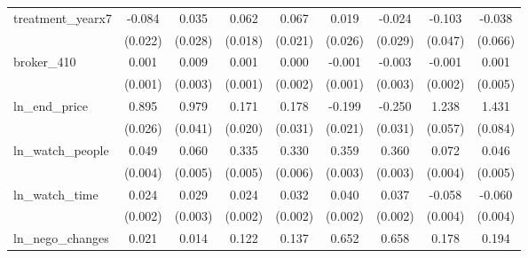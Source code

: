 {\begin{adjustbox}{max width=\textwidth}
\begin{tabular}{l*{8}{c}}
\addlinespace
treatment\_yearx7&      -0.084\sym{***}&       0.035         &       0.062\sym{***}&       0.067\sym{***}&       0.019         &      -0.024         &      -0.103\sym{**} &      -0.038         \\
            &     (0.022)         &     (0.028)         &     (0.018)         &     (0.021)         &     (0.026)         &     (0.029)         &     (0.047)         &     (0.066)         \\
\addlinespace
broker\_410  &       0.001         &       0.009\sym{***}&       0.001         &       0.000         &      -0.001         &      -0.003         &      -0.001         &       0.001         \\
            &     (0.001)         &     (0.003)         &     (0.001)         &     (0.002)         &     (0.001)         &     (0.003)         &     (0.002)         &     (0.005)         \\
\addlinespace
ln\_end\_price&       0.895\sym{***}&       0.979\sym{***}&       0.171\sym{***}&       0.178\sym{***}&      -0.199\sym{***}&      -0.250\sym{***}&       1.238\sym{***}&       1.431\sym{***}\\
            &     (0.026)         &     (0.041)         &     (0.020)         &     (0.031)         &     (0.021)         &     (0.031)         &     (0.057)         &     (0.084)         \\
\addlinespace
ln\_watch\_people&       0.049\sym{***}&       0.060\sym{***}&       0.335\sym{***}&       0.330\sym{***}&       0.359\sym{***}&       0.360\sym{***}&       0.072\sym{***}&       0.046\sym{***}\\
            &     (0.004)         &     (0.005)         &     (0.005)         &     (0.006)         &     (0.003)         &     (0.003)         &     (0.004)         &     (0.005)         \\
\addlinespace
ln\_watch\_time&       0.024\sym{***}&       0.029\sym{***}&       0.024\sym{***}&       0.032\sym{***}&       0.040\sym{***}&       0.037\sym{***}&      -0.058\sym{***}&      -0.060\sym{***}\\
            &     (0.002)         &     (0.003)         &     (0.002)         &     (0.002)         &     (0.002)         &     (0.002)         &     (0.004)         &     (0.004)         \\
\addlinespace
ln\_nego\_changes&       0.021\sym{***}&       0.014         &       0.122\sym{***}&       0.137\sym{***}&       0.652\sym{***}&       0.658\sym{***}&       0.178\sym{***}&       0.194\sym{***}\\

\end{tabular}
\end{adjustbox}}
